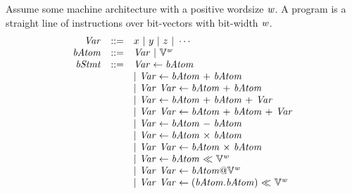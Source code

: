 Assume some machine architecture with a positive wordsize $\mathit{w}$.
A program is a straight line of instructions over bit-vectors with bit-width $\mathit{w}$.
\[
\begin{array}{rcl}
  \Var & ::= & {x} \ |\ {y} \ |\ {z} \ |\ \cdots \\
  \bvAtom & ::= & \Var \ |\ \BV^{\wordsize} \\
  \bvStmt & ::= & \Var \leftarrow \bvAtom \\
          &     & |\ \Var \leftarrow \bvAtom\ {+}\ \bvAtom \\
          &     & |\ \Var\ \Var \leftarrow \bvAtom\ {+}\ \bvAtom \\
          &     & |\ \Var \leftarrow \bvAtom\ {+}\ \bvAtom\ {+}\ \Var \\
          &     & |\ \Var\ \Var \leftarrow \bvAtom\ {+}\ \bvAtom\ {+}\ \Var  \\
          &     & |\ \Var \leftarrow \bvAtom\ {-}\ \bvAtom \\
          &     & |\ \Var \leftarrow \bvAtom\ {\times}\ \bvAtom \\
          &     & |\ \Var\ \Var \leftarrow \bvAtom\ {\times}\ \bvAtom \\
          &     & |\ \Var \leftarrow \bvAtom\ {\ll}\ \BV^{\wordsize} \\
          &     & |\ \Var\ \Var \leftarrow \bvAtom {@} \BV^{\wordsize} \\
          &     & |\ \Var\ \Var \leftarrow (\bvAtom {.} \bvAtom)\ {\ll}\ \BV^{\wordsize}
\end{array}
\]

